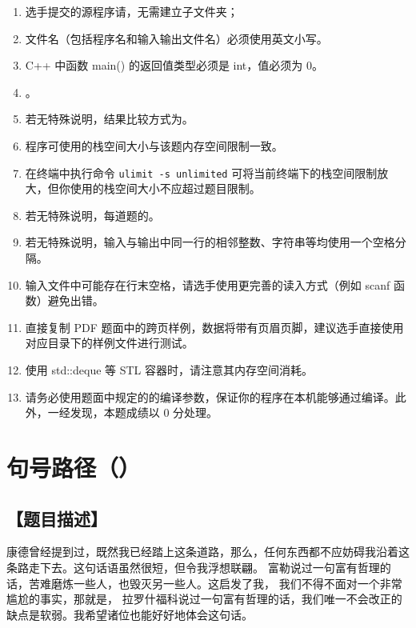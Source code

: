 \documentclass{statement}
\begin{document}
\begin{titlingpage}
        \Attention
        \begin{enumerate}
            \item 选手提交的源程序请，无需建立子文件夹；
            \item 文件名（包括程序名和输入输出文件名）必须使用英文小写。
            \item C++ 中函数 main() 的返回值类型必须是 int，值必须为 0。
            \item {}。
            \item 若无特殊说明，结果比较方式为。
            \item 程序可使用的栈空间大小与该题内存空间限制一致。
            \item 在终端中执行命令 \texttt{ulimit -s unlimited} 可将当前终端下的栈空间限制放大，但你使用的栈空间大小不应超过题目限制。
            \item 若无特殊说明，每道题的。
            \item 若无特殊说明，输入与输出中同一行的相邻整数、字符串等均使用一个空格分隔。
            \item 输入文件中可能存在行末空格，请选手使用更完善的读入方式（例如 scanf 函数）避免出错。
            \item 直接复制 PDF 题面中的跨页样例，数据将带有页眉页脚，建议选手直接使用对应目录下的样例文件进行测试。
            \item 使用 std::deque 等 STL 容器时，请注意其内存空间消耗。
            \item 请务必使用题面中规定的的编译参数，保证你的程序在本机能够通过编译。此外，一经发现，本题成绩以 0 分处理。
        \end{enumerate}
    \end{titlingpage}


    \section{句号路径（）}
    \subsection[题目描述]{【题目描述】}

    康德曾经提到过，既然我已经踏上这条道路，那么，任何东西都不应妨碍我沿着这条路走下去。这句话语虽然很短，但令我浮想联翩。 富勒说过一句富有哲理的话，苦难磨炼一些人，也毁灭另一些人。这启发了我， 我们不得不面对一个非常尴尬的事实，那就是， 拉罗什福科说过一句富有哲理的话，我们唯一不会改正的缺点是软弱。我希望诸位也能好好地体会这句话。 
    
\end{document}
